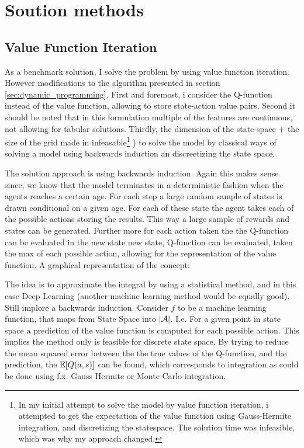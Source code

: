 \section{Soution methods}

\subsection{Value Function Iteration}

As a benchmark solution, I solve the problem by using value function iteration. However modifications to the algorithm presented in section \ref{sec:dynamic_programming}. First and foremost, i consider the Q-function instead of the value function, allowing to store state-action value pairs. Second it should be noted that in this formulation multiple of the features are continuous, not allowing for tabular solutions. Thirdly, the dimension of the state-space + the size of the grid made in infeasable\footnote{In my initial attempt to solve the model by value function iteration, i attempted to get the expectation of the value function using Gauss-Hermite integration, and discretizing the statespace. The solution time was infeasible, which was why my approach changed.}
) to solve the model by classical ways of solving a model using backwards induction an discreetizing the state space. 

The solution approach is using backwards induction. Again this makes sense since, we know that the model terminates in a deterministic fashion when the agents reaches a certain age. For each step a large random sample of states is drawn conditional on a given age. For each of these state the agent takes each of the possible actions storing the results. This way a large sample of rewards and states can be generated. Further more for each action taken the the Q-function can be evaluated in the new state new state, Q-function can be evaluated, taken the max of each possible action, allowing for the representation of the value function. A graphical representation of the concept:



The idea is to approximate the integral by using a statistical method, and in this case Deep Learning (another machine learning method would be equally good). Still implore a backwards induction. Consider $f$ to be a machine learning function, that maps from State Space into $\vert \mathcal{A} \vert$. I.e. For a given point in state space a prediction of the value function is computed for each possible action. This implies the method only is feasible for discrete state space. By trying to reduce the mean squared error between the the true values of the Q-function, and the prediction, the $\mathbb{E}[Q(a, s)]$ can be found, which corresponds to integration as could be done using f.x. Gauss Hermite or Monte Carlo integration.

